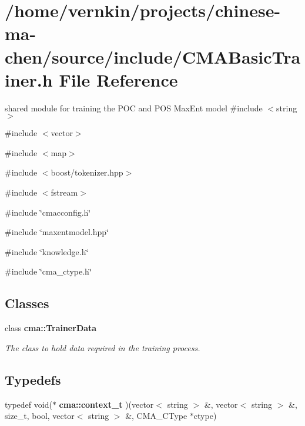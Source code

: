 \section{/home/vernkin/projects/chinese-\/ma-\/chen/source/include/CMABasicTrainer.h File Reference}
\label{CMABasicTrainer_8h}


shared module for training the POC and POS MaxEnt model  
{\ttfamily \#include $<$string$>$}\par
{\ttfamily \#include $<$vector$>$}\par
{\ttfamily \#include $<$map$>$}\par
{\ttfamily \#include $<$boost/tokenizer.hpp$>$}\par
{\ttfamily \#include $<$fstream$>$}\par
{\ttfamily \#include \char`\"{}cmacconfig.h\char`\"{}}\par
{\ttfamily \#include \char`\"{}maxentmodel.hpp\char`\"{}}\par
{\ttfamily \#include \char`\"{}knowledge.h\char`\"{}}\par
{\ttfamily \#include \char`\"{}cma\_\-ctype.h\char`\"{}}\par
\subsection*{Classes}
\begin{DoxyCompactItemize}
\item 
class {\bf cma::TrainerData}
\begin{DoxyCompactList}\small\item\em The class to hold data required in the training process. \item\end{DoxyCompactList}\end{DoxyCompactItemize}
\subsection*{Typedefs}
\begin{DoxyCompactItemize}
\item 
typedef void($\ast$ {\bf cma::context\_\-t} )(vector$<$ string $>$ \&, vector$<$ string $>$ \&, size\_\-t, bool, vector$<$ string $>$ \&, CMA\_\-CType $\ast$ctype)
\end{DoxyCompactItemize}

